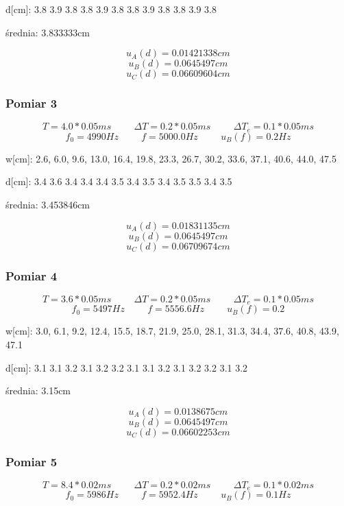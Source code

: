 \documentclass[12pt,a4paper]{article}
\begin{document}
d[cm]: 3.8 3.9 3.8 3.8 3.9 3.8 3.8 3.9 3.8 3.8 3.9 3.8

\begin{center}
średnia: 3.833333cm
\end{center}

$$
u_A(d) = 0.01421338cm
$$
$$u_B(d) = 0.0645497cm $$
$$u_C(d) = 0.06609604cm $$
\subsubsection{Pomiar 3}
$$
T = 4.0*0.05ms \hspace{1cm} \Delta T = 0.2*0.05ms \hspace{1cm} \Delta T_e = 0.1*0.05ms 
$$
$$
f_0 = 4990 Hz \hspace{1cm} f=5000.0Hz \hspace{1cm} u_B(f)=0.2Hz
$$

w[cm]: 2.6, 6.0, 9.6, 13.0, 16.4, 19.8, 23.3, 26.7, 30.2, 33.6, 37.1, 40.6, 44.0, 47.5

d[cm]: 3.4 3.6 3.4 3.4 3.4 3.5 3.4 3.5 3.4 3.5 3.5 3.4 3.5

\begin{center}
średnia: 3.453846cm
\end{center}

$$
u_A(d) = 0.01831135cm
$$
$$u_B(d) = 0.0645497cm $$
$$u_C(d) = 0.06709674cm $$
\subsubsection{Pomiar 4}
$$
T = 3.6*0.05ms \hspace{1cm} \Delta T = 0.2*0.05ms \hspace{1cm} \Delta T_e = 0.1*0.05ms 
$$
$$
f_0 = 5497 Hz \hspace{1cm} f=5556.6Hz \hspace{1cm} u_B(f)=0.2
$$

w[cm]: 3.0, 6.1, 9.2, 12.4, 15.5, 18.7, 21.9, 25.0, 28.1, 31.3, 34.4, 37.6, 40.8, 43.9, 47.1

d[cm]: 3.1 3.1 3.2 3.1 3.2 3.2 3.1 3.1 3.2 3.1 3.2 3.2 3.1 3.2

\begin{center}
średnia: 3.15cm
\end{center}

$$
u_A(d) = 0.0138675cm
$$
$$u_B(d) = 0.0645497cm $$
$$u_C(d) = 0.06602253cm $$
\subsubsection{Pomiar 5}
$$
T = 8.4*0.02ms \hspace{1cm} \Delta T = 0.2*0.02ms \hspace{1cm} \Delta T_e = 0.1*0.02ms 
$$
$$
f_0 = 5986 Hz \hspace{1cm} f=5952.4Hz \hspace{1cm} u_B(f)=0.1Hz
$$
\end{document}
